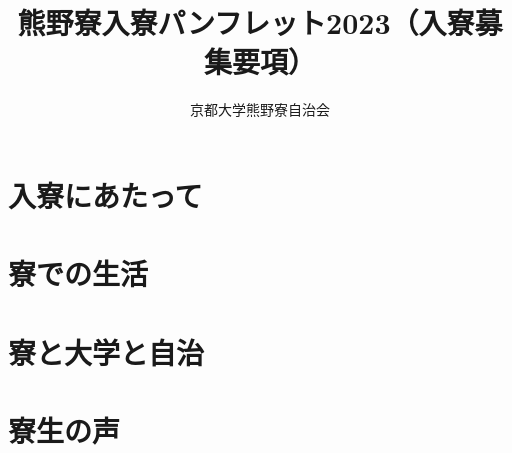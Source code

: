 \documentclass[10pt,a4j,dvipdfmx,openany,uplatex]{jsbook}
\title{熊野寮入寮パンフレット2023（入寮募集要項）}
\author{京都大学熊野寮自治会}
\date{}
\begin{document}

  {\small
  \setcounter{tocdepth}{1}%
  \tableofcontents
  }

 
\chapter{入寮にあたって}

  

  \clearpage

  

  



\chapter{寮での生活}

  

  \newpage

  

  \newpage

  

  \newpage
  
  
  
  \newpage
  
  

  

\chapter{寮と大学と自治}
  
  \clearpage
  
  \clearpage
  
  \clearpage
  

  \newpage
  
  

\chapter{寮生の声}
  
  \newpage
  
  
  
  
\newpage

  
\end{document}
